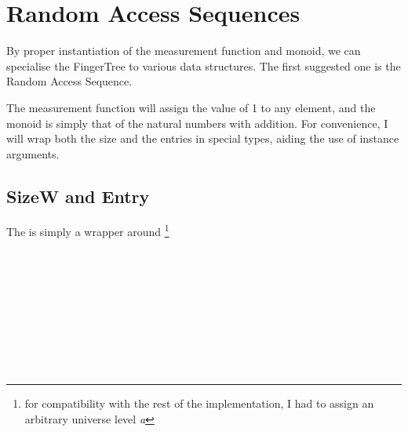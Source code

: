 \documentclass[12pt,twoside,notitlepage]{report}
\begin{document}
\section{Random Access Sequences}

By proper instantiation of the measurement function and monoid, we can specialise the FingerTree to various data structures. The first suggested one is the Random Access Sequence.

The measurement function will assign the value of 1 to any element, and the monoid is simply that of the natural numbers with addition. For convenience, I will wrap both the size and the entries in special types, aiding the use of instance arguments.

\subsection{SizeW and Entry}

The  is simply a wrapper around \footnote{for compatibility with the rest of the implementation, I had to assign an arbitrary universe level \textit{a}} 


\begin{code}
\\
\>[0]\<[2]%
\>[2]  \AgdaSymbol{\{}\AgdaSymbol{\}} \AgdaSymbol{:}   \<[26]%
\>[26]\<%
\\
\>[2]\<[4]%
\>[4] \AgdaSymbol{:}  \AgdaSymbol{(} \AgdaSymbol{:} \AgdaSymbol{)}   \AgdaSymbol{\{}\AgdaSymbol{\}}\<%
\\
\>[0]\<[2]%
\>[2] \AgdaSymbol{:}  \AgdaSymbol{\{} \AgdaSymbol{:} \AgdaSymbol{\}}   \AgdaSymbol{\{}\AgdaSymbol{\}}\<%
\\
\>[0]\<[2]%
\>[2] \AgdaSymbol{=}  \<%
\\
%
\\
\>[0]\<[2]%
\>[2] \AgdaSymbol{:} \<[9]%
\>[9] \AgdaSymbol{\{}\AgdaSymbol{\}}   \AgdaSymbol{\{}\AgdaSymbol{\}}   \AgdaSymbol{\{}\AgdaSymbol{\}}   \AgdaSymbol{\{}\AgdaSymbol{\}}\<%
\\
\>[0]\<[2]%
\>[2]     \AgdaSymbol{=}  \AgdaSymbol{(} \AgdaPrimitive{+} \AgdaSymbol{)}\<%
\\
\end{code}
\end{document}

